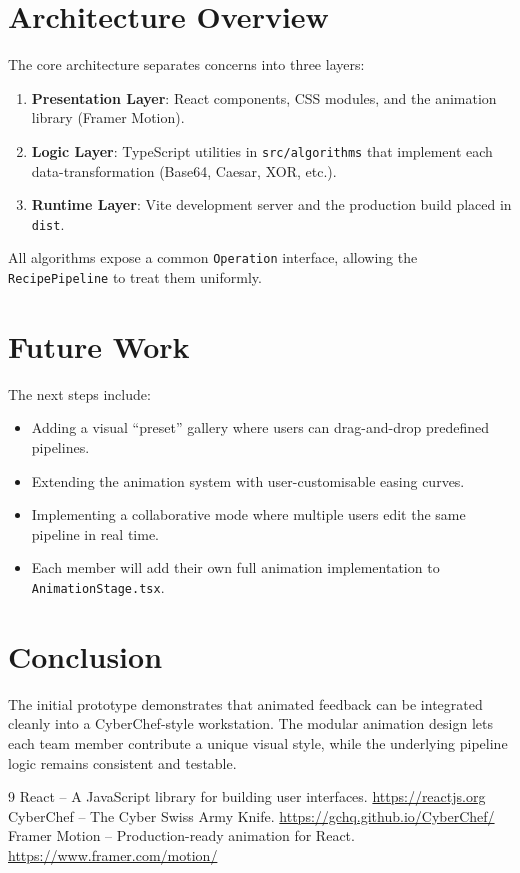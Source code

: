 \documentclass{report}
\begin{document}
\section{Architecture Overview}
The core architecture separates concerns into three layers:
\begin{enumerate}
  \item \textbf{Presentation Layer}: React components, CSS modules, and the animation library (Framer Motion).
  \item \textbf{Logic Layer}: TypeScript utilities in \texttt{src/algorithms} that implement each data-transformation (Base64, Caesar, XOR, etc.).
  \item \textbf{Runtime Layer}: Vite development server and the production build placed in \texttt{dist}.
\end{enumerate}

All algorithms expose a common \texttt{Operation} interface, allowing the \texttt{RecipePipeline} to treat them uniformly.

\section{Future Work}
The next steps include:
\begin{itemize}
  \item Adding a visual ``preset'' gallery where users can drag-and-drop predefined pipelines.
  \item Extending the animation system with user-customisable easing curves.
  \item Implementing a collaborative mode where multiple users edit the same pipeline in real time.
  \item Each member will add their own full animation implementation to \texttt{AnimationStage.tsx}.
\end{itemize}

\section{Conclusion}
The initial prototype demonstrates that animated feedback can be integrated cleanly into a CyberChef-style workstation. The modular animation design lets each team member contribute a unique visual style, while the underlying pipeline logic remains consistent and testable.


\begin{thebibliography}{9}
 React -- A JavaScript library for building user interfaces. \url{https://reactjs.org}
 CyberChef -- The Cyber Swiss Army Knife. \url{https://gchq.github.io/CyberChef/}
 Framer Motion -- Production-ready animation for React. \url{https://www.framer.com/motion/}
\end{thebibliography}
\end{document}
